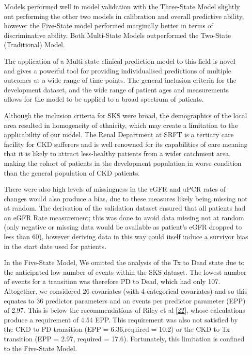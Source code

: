 \documentclass[12pt,PhD,twoside,openright]{muthesis}
\begin{document}
Models performed well in model validation with the Three-State Model slightly out performing the other two models in calibration and overall predictive ability, however the Five-State model performed marginally better in terms of discriminative ability. Both Multi-State Models outperformed the Two-State (Traditional) Model.

The application of a Multi-state clinical prediction model to this field is novel and gives a powerful tool for providing individualised predictions of multiple outcomes at a wide range of time points. The general inclusion criteria for the development dataset, and the wide range of patient ages and measurements allows for the model to be applied to a broad spectrum of patients.

Although the inclusion criteria for SKS were broad, the demographics of the local area resulted in homogeneity of ethnicity, which may create a limitation to the applicability of our model. The Renal Department at SRFT is a tertiary care facility for CKD sufferers and is well renowned for its capabilities of care meaning that it is likely to attract less-healthy patients from a wider catchment area, making the cohort of patients in the development population in worse condition than the general population of CKD patients.

There were also high levels of missingness in the eGFR and uPCR rates of changes would also produce a bias, due to these measures likely being missing not at random. The derivation of the validation dataset ensured that all patients had an eGFR Rate measurement; this was done to avoid data missing not at random (only negative or missing data would be available as patient's eGFR dropped to less than 60), however deriving data in this way could itself induce a survivor bias in the start date used for patients.

In the Five-State Model, We omitted the analysis of the Tx to Dead state due to the anticipated low number of events within the SKS dataset. The lowest number of events for a transition was therefore PD to Dead, which had only 107. Altogether, we considered 26 covariates (with 4 categorical covariates) and so this equates to 36 predictor parameters and an events per predictor parameter (EPP) of 2.97. This is below the recommendations of Riley et al {[}\protect\hyperlink{ref-riley_minimum_2019}{22}{]}, whose calculations produce a requirement of 4.54 EPP. This requirement was also not satisfied by the CKD to PD transition (EPP = 6.36,required = 10.2) or the CKD to Tx transition (EPP = 2.97, required = 17.6). Fortunately, this limitation is confined to the Five-State Model.
\end{document}

